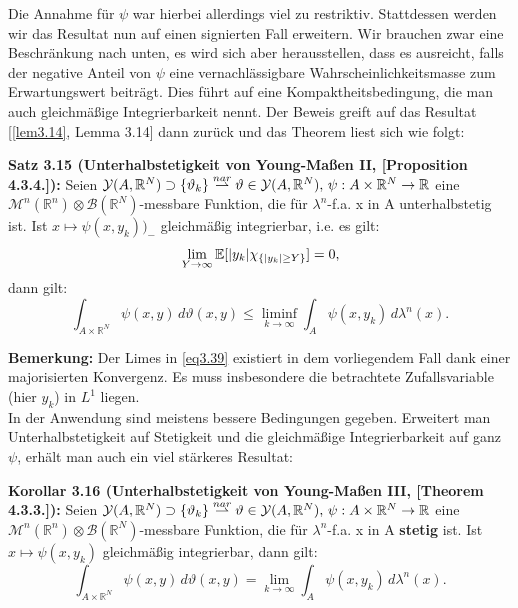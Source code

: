 Die Annahme für \(\psi\) war hierbei allerdings viel zu restriktiv. Stattdessen werden wir das Resultat nun auf einen signierten Fall erweitern. Wir brauchen zwar eine Beschränkung nach unten, es wird sich aber herausstellen, dass es ausreicht, falls der negative Anteil von \(\psi\) eine vernachlässigbare Wahrscheinlichkeitsmasse zum Erwartungswert beiträgt. Dies führt auf eine Kompaktheitsbedingung, die man auch gleichmäßige Integrierbarkeit nennt. Der Beweis greift auf das Resultat [\ref{lem3.14}, Lemma 3.14] dann zurück und das Theorem liest sich wie folgt:\\[0.5cm]
\colorbox{generalYellow}{\begin{minipage}{16cm}{\textcolor{black}{}{\label{theo3.15}}}
\textbf{Satz 3.15 (Unterhalbstetigkeit von Young-Maßen II, \cite{AttouchCalcVar}[Proposition 4.3.4.]):} Seien \(\mathcal{Y}(A,\mathbb{R}^N) \supset \{\vartheta_k\} \stackrel{nar}{\rightharpoonup} \vartheta \in \mathcal{Y}(A,\mathbb{R}^N), \, \psi : A \times \mathbb{R}^N \to \mathbb{R}\) eine \(\mathcal{M}^n(\mathbb{R}^n) \otimes \mathcal{B}(\mathbb{R}^N)\)-messbare Funktion, die für \(\lambda^n\)-f.a. x in A unterhalbstetig ist. Ist \(x \mapsto \psi(x,y_k))_{-}\) gleichmäßig integrierbar, i.e. es gilt:
\begin{equation}{\label{eq3.39}}
    \lim_{Y \to \infty} \mathbb{E}[|y_k| \chi_{\{|y_k| \geq Y\}}] = 0,
\end{equation}
dann gilt:
\begin{equation}
    \int_{A \times \mathbb{R}^N} \psi(x,y) \, d\vartheta(x,y) \leq \liminf_{k \to \infty} \int_A \psi(x,y_k) \, d\lambda^n(x). 
\end{equation}
\end{minipage}}

\textbf{Bemerkung:} Der Limes in \eqref{eq3.39} existiert in dem vorliegendem Fall dank einer majorisierten Konvergenz. Es muss insbesondere die betrachtete Zufallsvariable (hier \(y_k\)) in \(L^1\) liegen.\\

In der Anwendung sind meistens bessere Bedingungen gegeben. Erweitert man Unterhalbstetigkeit auf Stetigkeit und die gleichmäßige Integrierbarkeit auf ganz \(\psi\), erhält man auch ein viel stärkeres Resultat:\\[0.5cm]
\colorbox{generalYellow}{\begin{minipage}{16cm}{\textcolor{black}{}{\label{kor3.16}}}
\textbf{Korollar 3.16 (Unterhalbstetigkeit von Young-Maßen III, \cite{AttouchCalcVar}[Theorem 4.3.3.]):} Seien \(\mathcal{Y}(A,\mathbb{R}^N) \supset \{\vartheta_k\} \stackrel{nar}{\rightharpoonup} \vartheta \in \mathcal{Y}(A,\mathbb{R}^N), \, \psi : A \times \mathbb{R}^N \to \mathbb{R}\) eine \(\mathcal{M}^n(\mathbb{R}^n) \otimes \mathcal{B}(\mathbb{R}^N)\)-messbare Funktion, die für \(\lambda^n\)-f.a. x in A \textbf{stetig} ist. Ist \(x \mapsto \psi(x,y_k)\) gleichmäßig integrierbar, dann gilt:
\begin{equation}
    \int_{A \times \mathbb{R}^N} \psi(x,y) \, d\vartheta(x,y) = \lim_{k \to \infty} \int_A \psi(x,y_k) \, d\lambda^n(x). 
\end{equation}
\end{minipage}}

